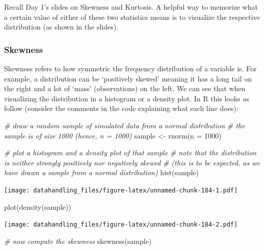 \documentclass[
  12pt,
]{style/krantz}
\newenvironment{Shaded}{\begin{snugshade}}{\end{snugshade}}
\newcommand{\AttributeTok}[1]{\textcolor[rgb]{0.77,0.63,0.00}{#1}}
\newcommand{\CommentTok}[1]{\textcolor[rgb]{0.56,0.35,0.01}{\textit{#1}}}
\newcommand{\DecValTok}[1]{\textcolor[rgb]{0.00,0.00,0.81}{#1}}
\newcommand{\FunctionTok}[1]{\textcolor[rgb]{0.00,0.00,0.00}{#1}}
\newcommand{\NormalTok}[1]{#1}
\newcommand{\OtherTok}[1]{\textcolor[rgb]{0.56,0.35,0.01}{#1}}
\begin{document}
Recall Day 1's slides on Skewness and Kurtosis. A helpful way to memorize what a certain value of either of these two statistics means is to visualize the respective distribution (as shown in the slides).

\hypertarget{skewness}{%
\subsubsection{Skewness}\label{skewness}}

Skewness refers to how symmetric the frequency distribution of a variable is. For example, a distribution can be `positively skewed' meaning it has a long tail on the right and a lot of `mass' (observations) on the left. We can see that when visualizing the distribution in a histogram or a density plot. In R this looks as follow (consider the comments in the code explaining what each line does):

\begin{Shaded}
\begin{Highlighting}[]
\CommentTok{\# draw a random sample of simulated data from a normal distribution}
\CommentTok{\# the sample is of size 1000 (hence, n = 1000)}
\NormalTok{sample }\OtherTok{\textless{}{-}} \FunctionTok{rnorm}\NormalTok{(}\AttributeTok{n =} \DecValTok{1000}\NormalTok{)}

\CommentTok{\# plot a histogram and a density plot of that sample}
\CommentTok{\# note that the distribution is neither strongly positively nor negatively skewed}
\CommentTok{\# (this is to be expected, as we have drawn a sample from a normal distribution)}
\FunctionTok{hist}\NormalTok{(sample)}
\end{Highlighting}
\end{Shaded}

\texttt{[image: datahandling\_files/figure-latex/unnamed-chunk-184-1.pdf]}

\begin{Shaded}
\begin{Highlighting}[]
\FunctionTok{plot}\NormalTok{(}\FunctionTok{density}\NormalTok{(sample))}
\end{Highlighting}
\end{Shaded}

\texttt{[image: datahandling\_files/figure-latex/unnamed-chunk-184-2.pdf]}

\begin{Shaded}
\begin{Highlighting}[]
\CommentTok{\# now compute the skewness}
\FunctionTok{skewness}\NormalTok{(sample)}
\end{Highlighting}
\end{Shaded}
\end{document}
